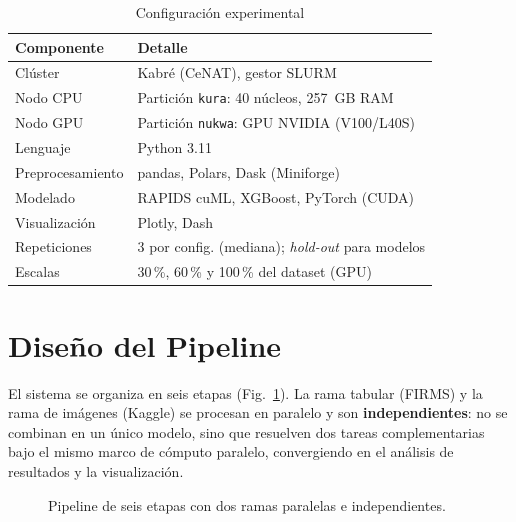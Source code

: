 \documentclass[conference]{IEEEtran}
\begin{document}
\begin{table}[tb]
\caption{Configuración experimental}
\label{tab:config}
\centering
\renewcommand{\arraystretch}{1.25}
\begin{tabular}{p{2.4cm} p{5.1cm}}
\toprule
\textbf{Componente} & \textbf{Detalle} \\
\midrule
Clúster & Kabré (CeNAT), gestor SLURM \\
Nodo CPU & Partición \texttt{kura}: 40 núcleos, 257~GB RAM \\
Nodo GPU & Partición \texttt{nukwa}: GPU NVIDIA (V100/L40S) \\
Lenguaje & Python 3.11 \\
Preprocesamiento & pandas, Polars, Dask (Miniforge) \\
Modelado & RAPIDS cuML, XGBoost, PyTorch (CUDA) \\
Visualización & Plotly, Dash \\
Repeticiones & 3 por config. (mediana); \textit{hold-out} para modelos \\
Escalas & 30\,\%, 60\,\% y 100\,\% del dataset (GPU) \\
\bottomrule
\end{tabular}
\end{table}

\section{Diseño del Pipeline}
\label{sec:pipeline}
El sistema se organiza en seis etapas (Fig.~\ref{fig:pipeline}). La rama tabular (FIRMS) y la rama de imágenes (Kaggle) se procesan en paralelo y son \textbf{independientes}: no se combinan en un único modelo, sino que resuelven dos tareas complementarias bajo el mismo marco de cómputo paralelo, convergiendo en el análisis de resultados y la visualización.

\begin{figure}[tb]
\centering
{}
\caption{Pipeline de seis etapas con dos ramas paralelas e independientes.}
\label{fig:pipeline}
\end{figure}
\end{document}
